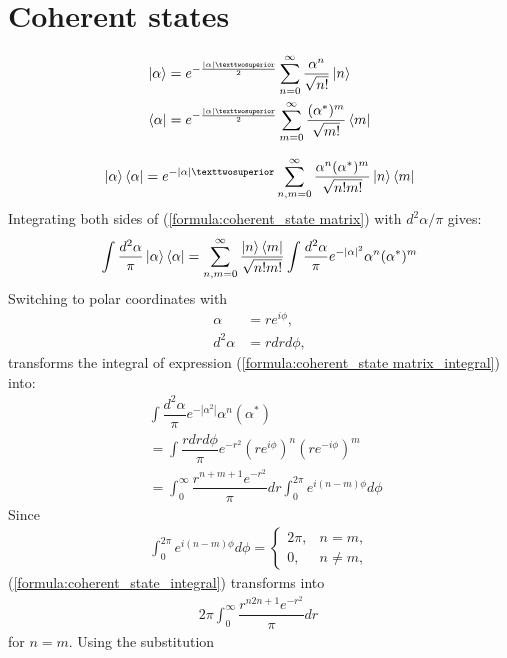 \documentclass[%
 reprint,
 amsmath,amssymb,
 aps,
twocolumn
]{revtex4-2}
\begin{document}
\section{Coherent states}
\begin{align}
    \ket{\alpha}&=e^{-\frac{|\alpha|²}{2}}\sum_{n=0}^\infty\dfrac{\alpha^n}{\sqrt{n!}}\ket{n}\\
    \bra{\alpha}&=e^{-\frac{|\alpha|²}{2}}\sum_{m=0}^\infty\dfrac{(\alpha^*)^m}{\sqrt{m!}}\bra{m}
\end{align}

\begin{align}\label{formula:coherent_state matrix}
\ket{\alpha}\bra{\alpha}=e^{-|\alpha|²}\sum_{n,m=0}^\infty\dfrac{\alpha^n(\alpha^*)^m}{\sqrt{n!m!}}\ket{n}\bra{m}
\end{align}
Integrating both sides of (\ref{formula:coherent_state matrix}) with $d^2\alpha/\pi$ gives:
\begin{align}\label{formula:coherent_state matrix_integral}
\int \dfrac{d^2\alpha}{\pi}\ket{\alpha}\bra{\alpha}=\sum_{n,m=0}^\infty\dfrac{\ket{n}\bra{m}}{\sqrt{n!m!}}\int\dfrac{d^2\alpha}{\pi}e^{-|\alpha|^2}\alpha^n(\alpha^*)^m
\end{align}
Switching to polar coordinates with
\begin{align}
\alpha&=re^{i\phi},\\
d^2\alpha&=rdrd\phi,
\end{align}
transforms the integral of expression (\ref{formula:coherent_state matrix_integral}) into:
\begin{align}\label{formula:coherent_state_integral}
&\int \dfrac{d^2\alpha}{\pi}e^{-|\alpha^2|}\alpha^n(\alpha^*)\\
&=\int\dfrac{rdrd\phi}{\pi}e^{-r^2}\left(re^{i\phi}\right)^n\left(re^{-i\phi}\right)^m\\
&=\int_{0}^{\infty}\dfrac{r^{n+m+1}e^{-r^2}}{\pi}dr\int_{0}^{2\pi}e^{i(n-m)\phi}d\phi
\end{align}
Since
\begin{align}
\int_{0}^{2\pi}e^{i(n-m)\phi}d\phi=
\begin{cases}
    2\pi, & n = m, \\
    0, & n\neq m,
\end{cases}
\end{align}
(\ref{formula:coherent_state_integral}) transforms into
\begin{align}
2\pi\int_{0}^{\infty}\dfrac{r^{n2n+1}e^{-r^2}}{\pi}dr\
\end{align}
for $n=m$. Using the substitution
\end{document}
